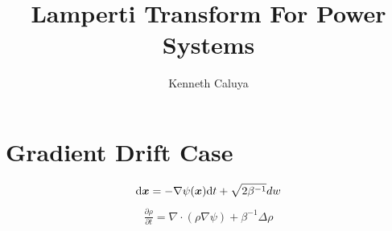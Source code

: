 \documentclass[11pt,twoside,a4paper]{article}
\begin{document}
\title{\huge{Lamperti Transform For Power Systems
}}

\author{Kenneth Caluya}

\markboth{\today}{}

\section{Gradient Drift Case}
\begin{align}
    {\rm{d}} {\bm{x}} = -\nabla \psi ({\bm{x}}) {\rm{d}} t + \sqrt{2\beta^{-1}} dw
\end{align}
\begin{align} \label{FPk}
    \frac{\partial \rho}{\partial t} = \nabla \cdot (\rho \nabla \psi) + \beta^{-1}\Delta \rho 
\end{align}
\end{document}

